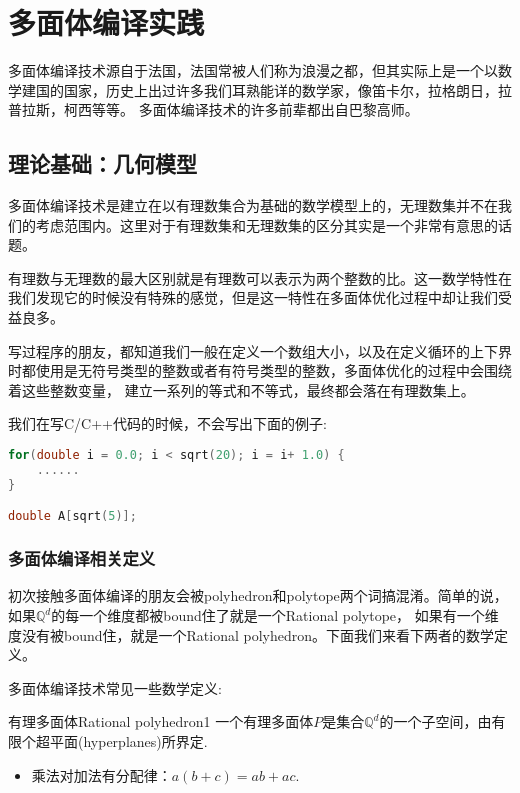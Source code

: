 
\chapter{多面体编译实践}

多面体编译技术源自于法国，法国常被人们称为浪漫之都，但其实际上是一个以数学建国的国家，历史上出过许多我们耳熟能详的数学家，像笛卡尔，拉格朗日，拉普拉斯，柯西等等。
多面体编译技术的许多前辈都出自巴黎高师。

\section{理论基础：几何模型}

多面体编译技术是建立在以有理数集合为基础的数学模型上的，无理数集并不在我们的考虑范围内。这里对于有理数集和无理数集的区分其实是一个非常有意思的话题。

有理数与无理数的最大区别就是有理数可以表示为两个整数的比。这一数学特性在我们发现它的时候没有特殊的感觉，但是这一特性在多面体优化过程中却让我们受益良多。

写过程序的朋友，都知道我们一般在定义一个数组大小，以及在定义循环的上下界时都使用是无符号类型的整数或者有符号类型的整数，多面体优化的过程中会围绕着这些整数变量，
建立一系列的等式和不等式，最终都会落在有理数集上。

我们在写C/C++代码的时候，不会写出下面的例子:
\begin{lstlisting}[language={C}, caption={一段C源代码}]
for(double i = 0.0; i < sqrt(20); i = i+ 1.0) {
    ......
}

double A[sqrt(5)];
\end{lstlisting}


\subsection{多面体编译相关定义}

初次接触多面体编译的朋友会被polyhedron和polytope两个词搞混淆。简单的说，如果$\mathbb{Q}^{d}$的每一个维度都被bound住了就是一个Rational polytope，
如果有一个维度没有被bound住，就是一个Rational polyhedron。下面我们来看下两者的数学定义。

多面体编译技术常见一些数学定义:
\begin{mydef}{有理多面体Rational polyhedron}{1}
	一个有理多面体$P$是集合$\mathbb{Q}^{d}$的一个子空间，由有限个超平面(hyperplanes)所界定.
	\begin{itemize}
		\item[(1)] 乘法对加法有分配律：$a ( b + c ) = a b + a c$.
	\end{itemize}
\end{mydef}



